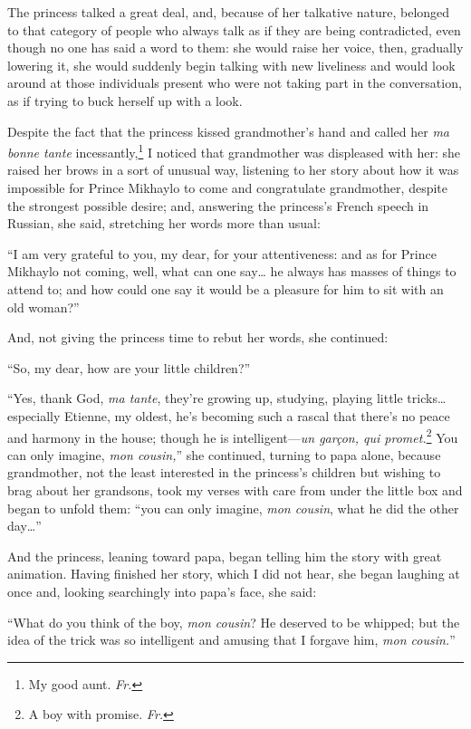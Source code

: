 The princess talked a great deal, and, because of her talkative nature, belonged to that category of people who always talk as if they are being contradicted, even though no one has said a word to them: she would raise her voice, then, gradually lowering it, she would suddenly begin talking with new liveliness and would look around at those individuals present who were not taking part in the conversation, as if trying to buck herself up with a look.

Despite the fact that the princess kissed grandmother's hand and called her \textit{ma bonne tante} incessantly,\footnote{My good aunt. \textit{Fr.}} I noticed that grandmother was displeased with her: she raised her brows in a sort of unusual way, listening to her story about how it was impossible for Prince Mikhaylo to come and congratulate grandmother, despite the strongest possible desire; and, answering the princess's French speech in Russian, she said, stretching her words more than usual:

``I am very grateful to you, my dear, for your attentiveness: and as for Prince Mikhaylo not coming, well, what can one say\ldots{} he always has masses of things to attend to; and how could one say it would be a pleasure for him to sit with an old woman?'' %

And, not giving the princess time to rebut her words, she continued:

``So, my dear, how are your little children?'' %

``Yes, thank God, \textit{ma tante}, they're growing up, studying, playing little tricks\ldots{} especially Etienne, my oldest, he's becoming such a rascal that there's no peace and harmony in the house; though he is intelligent---\textit{un gar\c con, qui promet.}\footnote{A boy with promise. \textit{Fr.}} You can only imagine, \textit{mon cousin,}'' she continued, turning to papa alone, because grandmother, not the least interested in the princess's children but wishing to brag about her grandsons, took my verses with care from under the little box and began to unfold them: ``you can only imagine, \textit{mon cousin}, what he did the other day\ldots{}'' %

And the princess, leaning toward papa, began telling him the story with great animation. Having finished her story, which I did not hear, she began laughing at once and, looking searchingly into papa's face, she said:

``What do you think of the boy, \textit{mon cousin}? He deserved to be whipped; but the idea of the trick was so intelligent and amusing that I forgave him, \textit{mon cousin.}'' %

